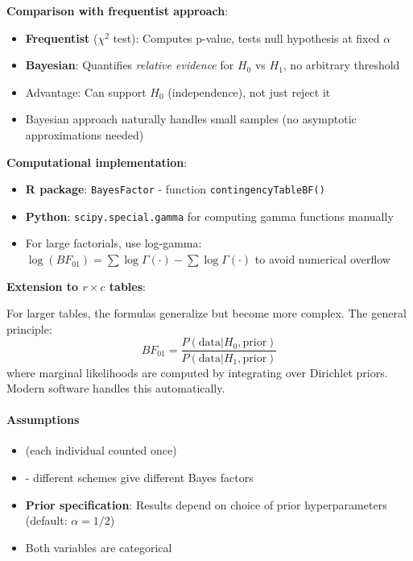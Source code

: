 \textbf{Comparison with frequentist approach}:
\begin{itemize}
    \item \textbf{Frequentist} ($\chi^2$ test): Computes p-value, tests null hypothesis at fixed $\alpha$
    \item \textbf{Bayesian}: Quantifies \emph{relative evidence} for $H_0$ vs $H_1$, no arbitrary threshold
    \item Advantage: Can support $H_0$ (independence), not just reject it
    \item Bayesian approach naturally handles small samples (no asymptotic approximations needed)
\end{itemize}

\textbf{Computational implementation}:
\begin{itemize}
    \item \textbf{R package}: \texttt{BayesFactor} - function \texttt{contingencyTableBF()}
    \item \textbf{Python}: \texttt{scipy.special.gamma} for computing gamma functions manually
    \item For large factorials, use log-gamma: $\log(BF_{01}) = \sum \log \Gamma(\cdot) - \sum \log \Gamma(\cdot)$
        to avoid numerical overflow
\end{itemize}

\textbf{Extension to $r \times c$ tables}:

For larger tables, the formulas generalize but become more complex. The general principle:
$$BF_{01} = \dfrac{P(\text{data} | H_0, \text{prior})}{P(\text{data} | H_1, \text{prior})}$$
where marginal likelihoods are computed by integrating over Dirichlet priors. Modern software
handles this automatically.

\paragraph{Assumptions}
\begin{itemize}
    \item {} (each individual counted once)
    \item {} - different schemes give different Bayes factors
    \item \textbf{Prior specification}: Results depend on choice of prior hyperparameters (default: $\alpha = 1/2$)
    \item Both variables are categorical
\end{itemize}

